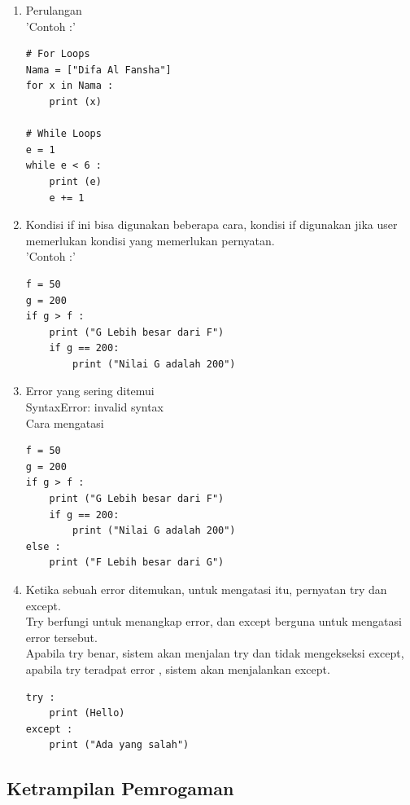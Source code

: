 \begin{enumerate}
\item Perulangan\\
'Contoh :'
\begin{verbatim}
# For Loops
Nama = ["Difa Al Fansha"]
for x in Nama :
    print (x)
    
# While Loops
e = 1
while e < 6 :
    print (e)
    e += 1
\end{verbatim}

\item Kondisi if  ini bisa digunakan beberapa cara, kondisi if digunakan jika user memerlukan kondisi yang memerlukan pernyatan.\\
'Contoh :'
\begin{verbatim}
f = 50
g = 200
if g > f :
    print ("G Lebih besar dari F")
    if g == 200:
        print ("Nilai G adalah 200")
\end{verbatim}

\item Error yang sering ditemui\\
SyntaxError: invalid syntax\\
Cara mengatasi\\
\begin{verbatim}
f = 50
g = 200
if g > f :
    print ("G Lebih besar dari F")
    if g == 200:
        print ("Nilai G adalah 200")
else :
    print ("F Lebih besar dari G")
\end{verbatim}

\item Ketika sebuah error ditemukan, untuk mengatasi itu, pernyatan try dan except.\\
Try berfungi untuk menangkap error, dan except berguna untuk mengatasi error tersebut.\\
Apabila try benar, sistem akan menjalan try dan tidak mengekseksi except, apabila try teradpat error , sistem akan menjalankan except.\\
\begin{verbatim}
try :
    print (Hello)
except :
    print ("Ada yang salah")
\end{verbatim}
\end{enumerate}

\subsection{Ketrampilan Pemrogaman}


